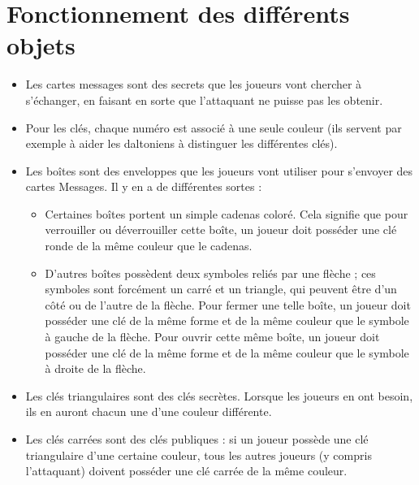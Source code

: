 \documentclass[a4paper,10pt]{article}
\begin{document}
\section{Fonctionnement des différents objets}
\begin{itemize}
	\item Les cartes messages sont des secrets que les joueurs vont chercher à s'échanger, en faisant en sorte que l'attaquant ne puisse pas les obtenir.
	\item Pour les clés, chaque numéro est associé à une seule couleur (ils servent par exemple à aider les daltoniens à distinguer les différentes clés).
	\item Les boîtes sont des enveloppes que les joueurs vont utiliser pour s'envoyer des cartes Messages. Il y en a de différentes sortes :
		\begin{itemize}
			\item Certaines boîtes portent un simple cadenas coloré. Cela signifie que pour verrouiller ou déverrouiller cette boîte, un joueur doit posséder une clé ronde de la même couleur que le cadenas.
			\item D'autres boîtes possèdent deux symboles reliés par une flèche ; ces symboles sont forcément un carré et un triangle, qui peuvent être d'un côté ou de l'autre de la flèche. Pour fermer une telle boîte, un joueur doit posséder une clé de la même forme et de la même couleur que le symbole à gauche de la flèche. Pour ouvrir cette même boîte, un joueur doit posséder une clé de la même forme et de la même couleur que le symbole à droite de la flèche. 
		\end{itemize}
	\item Les clés triangulaires sont des clés secrètes. Lorsque les joueurs en ont besoin, ils en auront chacun une d'une couleur différente.
	\item Les clés carrées sont des clés publiques : si un joueur possède une clé triangulaire d'une certaine couleur, tous les autres joueurs (y compris l'attaquant) doivent posséder une clé carrée de la même couleur.
\end{itemize}
\end{document}
